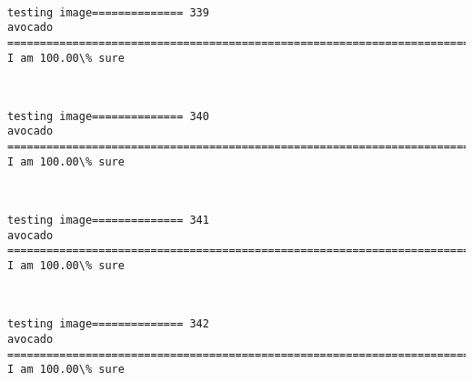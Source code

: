 \documentclass[11pt]{article}
\begin{document}
    \begin{center}
    \end{center}
    { \hspace*{\fill} \\}
    
    \begin{Verbatim}[commandchars=\\\{\}]
testing image============== 339
avocado
============================================================================
I am 100.00\% sure

    \end{Verbatim}

    \begin{center}
    \end{center}
    { \hspace*{\fill} \\}
    
    \begin{Verbatim}[commandchars=\\\{\}]
testing image============== 340
avocado
============================================================================
I am 100.00\% sure

    \end{Verbatim}

    \begin{center}
    \end{center}
    { \hspace*{\fill} \\}
    
    \begin{Verbatim}[commandchars=\\\{\}]
testing image============== 341
avocado
============================================================================
I am 100.00\% sure

    \end{Verbatim}

    \begin{center}
    \end{center}
    { \hspace*{\fill} \\}
    
    \begin{Verbatim}[commandchars=\\\{\}]
testing image============== 342
avocado
============================================================================
I am 100.00\% sure

    \end{Verbatim}
\end{document}
